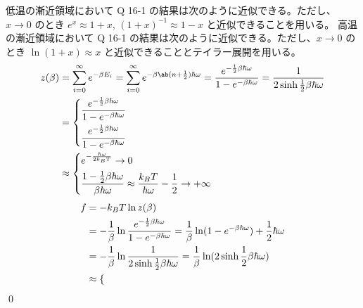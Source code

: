 \documentclass[uplatex,diffipdfmx,a4paper,11pt]{jlreq}
\makeatletter
\theoremstyle{definition}
\renewenvironment{proof}[1][\proofname]{\par
  \normalfont
  \topsep6\p@\@plus6\p@ \trivlist
  \item[\hskip\labelsep{\bfseries #1}\@addpunct{\bfseries}]\ignorespaces\quad\par
}{%
  \qed\endtrivlist\@endpefalse
}
\renewcommand\proofname{証明}
\makeatother
\begin{document}
\begin{proof}
  低温の漸近領域において Q 16-1 の結果は次のように近似できる。ただし、$x\to 0$ のとき $e^x \approx 1 + x$, $(1 + x)^{-1} \approx 1 - x$ と近似できることを用いる。
  高温の漸近領域において Q 16-1 の結果は次のように近似できる。ただし、$x\to 0$ のとき $\ln(1 + x) \approx x$ と近似できることとテイラー展開を用いる。
  \begin{align}
    z(\beta) & = \sum_{i = 0}^{\infty}e^{-\beta E_i} = \sum_{i = 0}^{\infty}e^{-\beta\ab(n + \frac{1}{2})\hbar\omega} = \frac{e^{-\frac{1}{2}\beta\hbar\omega}}{1 - e^{-\beta\hbar\omega}} = \frac{1}{2\sinh \frac{1}{2}\beta\hbar\omega} \\
             & = \begin{dcases}
                   \frac{e^{-\frac{1}{2}\beta\hbar\omega}}{1 - e^{-\beta\hbar\omega}} \\
                   \frac{e^{-\frac{1}{2}\beta\hbar\omega}}{1 - e^{-\beta\hbar\omega}} \\
                 \end{dcases}                                                                                                                                                \\
             & \approx \begin{dcases}
                         e^{-\frac{\hbar\omega}{2k_BT}} \to 0                                                                                \\
                         \frac{1 - \frac{1}{2}\beta\hbar\omega}{\beta\hbar\omega} \approx \frac{k_BT}{\hbar\omega} - \frac{1}{2} \to +\infty \\
                       \end{dcases}
  \end{align}
  \begin{align}
    f & = -k_BT\ln z(\beta)                                                                                                                                               \\
      & = -\frac{1}{\beta}\ln \frac{e^{-\frac{1}{2}\beta\hbar\omega}}{1 - e^{-\beta\hbar\omega}} = \frac{1}{\beta}\ln(1 - e^{-\beta\hbar\omega}) + \frac{1}{2}\hbar\omega \\
      & = -\frac{1}{\beta}\ln \frac{1}{2\sinh \frac{1}{2}\beta\hbar\omega} = \frac{1}{\beta}\ln(2\sinh \frac{1}{2}\beta\hbar\omega)                                       \\
      & \approx \begin{dcases}

\end{dcases}
\end{align}
\end{proof}
\end{document}
